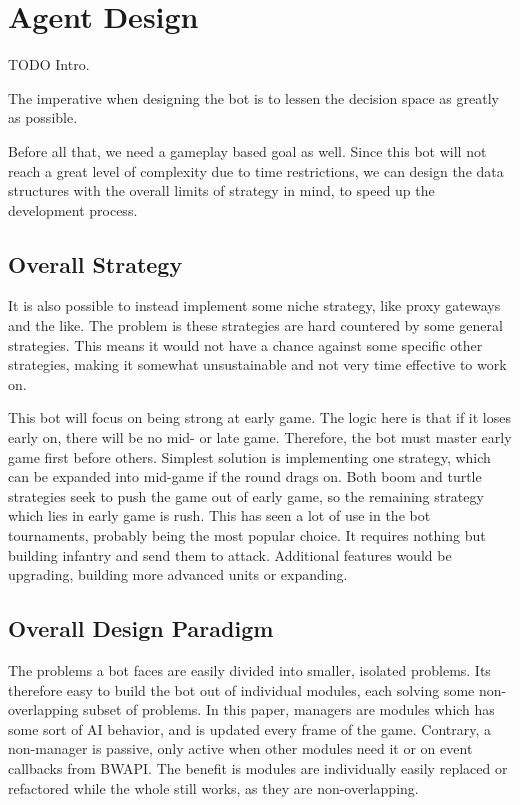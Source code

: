\chapter{Agent Design}
TODO Intro.

The imperative when designing the bot is to lessen the decision space as greatly as possible.

Before all that, we need a gameplay based goal as well. Since this bot will not reach a great level of complexity due to time restrictions, we can design the data structures with the overall limits of strategy in mind, to speed up the development process.

\section{Overall Strategy}

It is also possible to instead implement some niche strategy, like proxy gateways and the like. The problem is these strategies are hard countered by some general strategies. This means it would not have a chance against some specific other strategies, making it somewhat unsustainable and not very time effective to work on.

This bot will focus on being strong at early game. The logic here is that if it loses early on, there will be no mid- or late game. Therefore, the bot must master early game first before others. Simplest solution is implementing one strategy, which can be expanded into mid-game if the round drags on. Both boom and turtle strategies seek to push the game out of early game, so the remaining strategy which lies in early game is rush. This has seen a lot of use in the bot tournaments, probably being the most popular choice. It requires nothing but building infantry and send them to attack. Additional features would be upgrading, building more advanced units or expanding.

\section{Overall Design Paradigm}
The problems a bot faces are easily divided into smaller, isolated problems. Its therefore easy to build the bot out of individual modules, each solving some non-overlapping subset of problems. In this paper, managers are modules which has some sort of AI behavior, and is updated every frame of the game. Contrary, a non-manager is passive, only active when other modules need it or on event callbacks from BWAPI. The benefit is modules are individually easily replaced or refactored while the whole still works, as they are non-overlapping.

